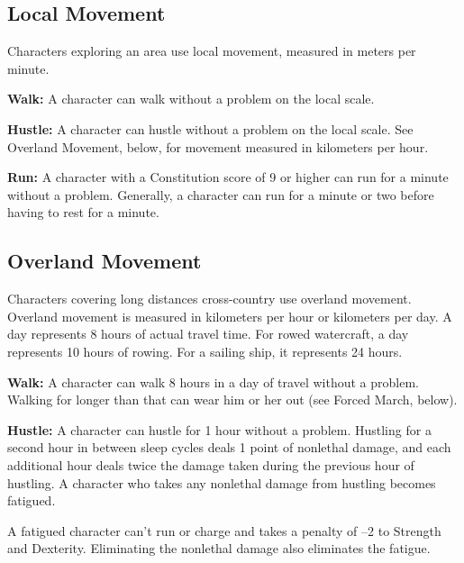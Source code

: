 

\subsection{Local Movement}
Characters exploring an area use local movement, measured in meters per minute.

\textbf{Walk:} A character can walk without a problem on the local scale.

\textbf{Hustle:} A character can hustle without a problem on the local scale. See Overland Movement, below, for movement measured in kilometers per hour.

\textbf{Run:} A character with a Constitution score of 9 or higher can run for a minute without a problem. Generally, a character can run for a minute or two before having to rest for a minute.

\subsection{Overland Movement}
Characters covering long distances cross-country use overland movement. Overland movement is measured in kilometers per hour or kilometers per day. A day represents 8 hours of actual travel time. For rowed watercraft, a day represents 10 hours of rowing. For a sailing ship, it represents 24 hours.

\textbf{Walk:} A character can walk 8 hours in a day of travel without a problem. Walking for longer than that can wear him or her out (see Forced March, below).

\textbf{Hustle:} A character can hustle for 1 hour without a problem. Hustling for a second hour in between sleep cycles deals 1 point of nonlethal damage, and each additional hour deals twice the damage taken during the previous hour of hustling. A character who takes any nonlethal damage from hustling becomes fatigued.

A fatigued character can't run or charge and takes a penalty of --2 to Strength and Dexterity. Eliminating the nonlethal damage also eliminates the fatigue.

